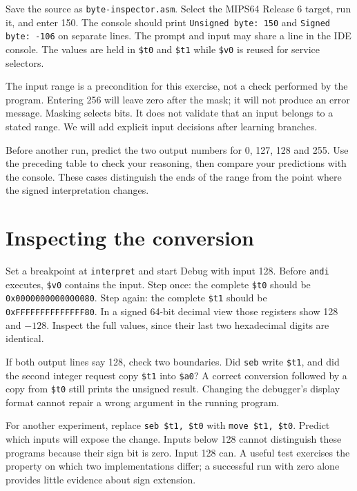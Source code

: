 Save the source as \texttt{byte-inspector.asm}. Select the MIPS64 Release 6 target,
run it, and enter 150. The console should print \texttt{Unsigned byte: 150} and
\texttt{Signed byte: -106} on separate lines. The prompt and input may share a
line in the IDE console. The values are held in \texttt{\$t0} and \texttt{\$t1}
while \texttt{\$v0} is reused for service selectors.

The input range is a precondition for this exercise, not a check performed by
the program. Entering 256 will leave zero after the mask; it will not produce an
error message. Masking selects bits. It does not validate that an input belongs
to a stated range. We will add explicit input decisions after learning branches.

Before another run, predict the two output numbers for 0, 127, 128 and 255.
Use the preceding table to check your reasoning, then compare your predictions
with the console. These cases distinguish the ends of the range from the point
where the signed interpretation changes.

\section{Inspecting the conversion}

Set a breakpoint at \texttt{interpret} and start Debug with input 128. Before
\texttt{andi} executes, \texttt{\$v0} contains the input. Step once: the complete
\texttt{\$t0} should be \texttt{0x0000000000000080}. Step again: the complete
\texttt{\$t1} should be \texttt{0xFFFFFFFFFFFFFF80}. In a signed 64-bit decimal
view those registers show 128 and $-128$. Inspect the full values, since their
last two hexadecimal digits are identical.

If both output lines say 128, check two boundaries. Did \texttt{seb} write
\texttt{\$t1}, and did the second integer request copy \texttt{\$t1} into
\texttt{\$a0}? A correct conversion followed by a copy from \texttt{\$t0} still
prints the unsigned result. Changing the debugger's display format cannot repair
a wrong argument in the running program.

For another experiment, replace \texttt{seb \$t1, \$t0} with
\texttt{move \$t1, \$t0}. Predict which inputs will expose the change.
Inputs below 128 cannot distinguish these programs because their sign bit is zero.
Input 128 can. A useful test exercises the property on which two implementations
differ; a successful run with zero alone provides little evidence about sign extension.


